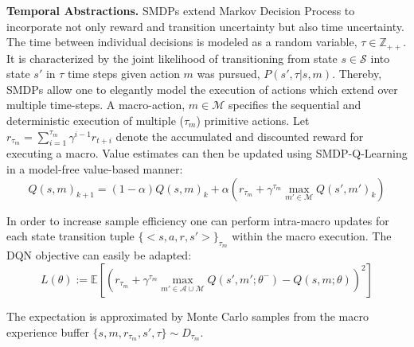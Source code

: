 \documentclass[10pt,letterpaper]{article}
\begin{document}
\textbf{Temporal Abstractions.} 
SMDPs extend Markov Decision Process to incorporate not only reward and transition uncertainty but also time uncertainty. The time between individual decisions is modeled as a random variable, $\tau \in \mathbb{Z}_{++}$. It is characterized by the joint likelihood of transitioning from state $s \in \mathcal{S}$ into state $s'$ in $\tau$ time steps given action $m$ was pursued, $P(s', \tau| s, m)$. Thereby, SMDPs allow one to elegantly model the execution of actions which extend over multiple time-steps. A macro-action, $m \in \mathcal{M}$ specifies the sequential and deterministic execution of multiple ($\tau_m$) primitive actions. Let $r_{\tau_m} = \sum_{i=1}^{\tau_m} \gamma^{i-1} r_{t+i}$ denote the accumulated and discounted reward for executing a macro. Value estimates can then be updated using SMDP-Q-Learning \cite{Parr_1998a} in a model-free value-based manner:
$$Q(s, m)_{k+1} = (1-\alpha) Q(s, m)_k + \alpha \left( r_{\tau_m} + \gamma^{\tau_m} \max_{m' \in \mathcal{M}} Q(s', m')_k \right)$$  

In order to increase sample efficiency one can perform intra-macro updates for each state transition tuple $\{<s,a,r,s'>\}_{\tau_m}$ within the macro execution.
The DQN \cite{Mnih_2013, Mnih_2015} objective can easily be adapted:
$$L(\theta) := \mathbb{E} [(r_{\tau_m} + \gamma^{\tau_m} \max_{m' \in \mathcal{A} \cup \mathcal{M}} Q(s',m';\theta^-) - Q(s,m; \theta))^2] $$

The expectation is approximated by Monte Carlo samples from the macro experience buffer $\{s,m,r_{\tau_m},s', \tau\} \sim D_{\tau_m}$.
\end{document}
